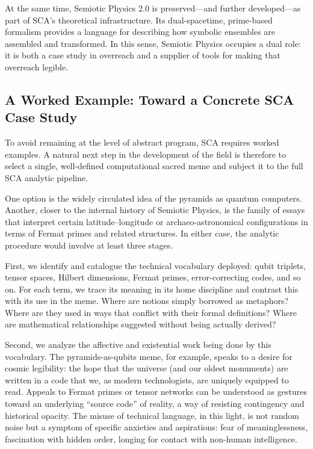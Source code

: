 \documentclass[12]{amsart}
\theoremstyle{plain}
\begin{document}
At the same time, Semiotic Physics 2.0 is preserved---and further developed---as part of SCA's theoretical infrastructure. Its dual-spacetime, prime-based formalism provides a language for describing how symbolic ensembles are assembled and transformed. In this sense, Semiotic Physics occupies a dual role: it is both a case study in overreach and a supplier of tools for making that overreach legible.

\subsection{A Worked Example: Toward a Concrete SCA Case Study}

To avoid remaining at the level of abstract program, SCA requires worked examples. A natural next step in the development of the field is therefore to select a single, well-defined computational sacred meme and subject it to the full SCA analytic pipeline.

One option is the widely circulated idea of the pyramids as quantum computers. Another, closer to the internal history of Semiotic Physics, is the family of essays that interpret certain latitude–longitude or archaeo-astronomical configurations in terms of Fermat primes and related structures. In either case, the analytic procedure would involve at least three stages.

First, we identify and catalogue the technical vocabulary deployed: qubit triplets, tensor spaces, Hilbert dimensions, Fermat primes, error-correcting codes, and so on. For each term, we trace its meaning in its home discipline and contrast this with its use in the meme. Where are notions simply borrowed as metaphors? Where are they used in ways that conflict with their formal definitions? Where are mathematical relationships suggested without being actually derived?

Second, we analyze the affective and existential work being done by this vocabulary. The pyramids-as-qubits meme, for example, speaks to a desire for cosmic legibility: the hope that the universe (and our oldest monuments) are written in a code that we, as modern technologists, are uniquely equipped to read. Appeals to Fermat primes or tensor networks can be understood as gestures toward an underlying ``source code'' of reality, a way of resisting contingency and historical opacity. The misuse of technical language, in this light, is not random noise but a symptom of specific anxieties and aspirations: fear of meaninglessness, fascination with hidden order, longing for contact with non-human intelligence.
\end{document}
